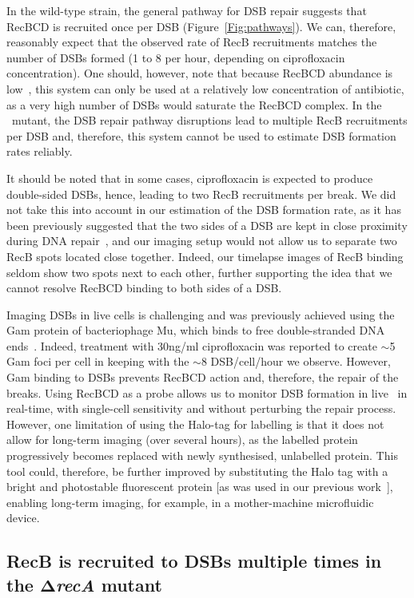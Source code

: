 In the wild-type strain, the general pathway for DSB repair suggests that RecBCD is recruited once per DSB (Figure~\ref{Fig:pathways}). We can, therefore, reasonably expect that the observed rate of RecB recruitments matches the number of DSBs formed (1 to 8 per hour, depending on ciprofloxacin concentration). One should, however, note that because RecBCD abundance is low~\cite{Lepore2019a}, this system can only be used at a relatively low concentration of antibiotic, as a very high number of DSBs would saturate the RecBCD complex. In the \dreca\ mutant, the DSB repair pathway disruptions lead to multiple RecB recruitments per DSB and, therefore, this system cannot be used to estimate DSB formation rates reliably. 

It should be noted that in some cases, ciprofloxacin is expected to produce double-sided DSBs, hence, leading to two RecB recruitments per break. We did not take this into account in our estimation of the DSB formation rate, as it has been previously suggested that the two sides of a DSB are kept in close proximity during DNA repair~\cite{Vickridge2017,Keyamura2019}, and our imaging setup would not allow us to separate two RecB spots located close together. Indeed, our timelapse images of RecB binding seldom show two spots next to each other, further supporting the idea that we cannot resolve RecBCD binding to both sides of a DSB.\@

Imaging DSBs in live cells is challenging and was previously achieved using the Gam protein of bacteriophage Mu, which binds to free double-stranded DNA ends~\cite{Shee2013,Pribis2019,Henrikus2020}. Indeed, treatment with 30ng/ml ciprofloxacin was reported to create $\sim$5 Gam foci per cell in keeping with the $\sim$8 DSB/cell/hour we observe. However, Gam binding to DSBs prevents RecBCD action and, therefore, the repair of the breaks. Using RecBCD as a probe allows us to monitor DSB formation in live \ecoli\ in real-time, with single-cell sensitivity and without perturbing the repair process. However, one limitation of using the Halo-tag for labelling is that it does not allow for long-term imaging (over several hours), as the labelled protein progressively becomes replaced with newly synthesised, unlabelled protein. This tool could, therefore, be further improved by substituting the Halo tag with a bright and photostable fluorescent protein [as was used in our previous work~\cite{Lepore2019a}], enabling long-term imaging, for example, in a mother-machine microfluidic device.

\subsection*{RecB is recruited to DSBs multiple times in the $\mathbf{\Delta}$\emph{recA} mutant}

